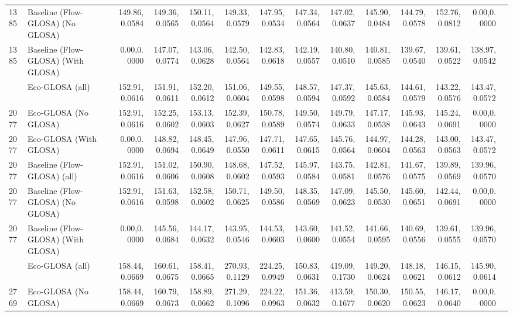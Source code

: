 \begin{table}[ht]
{\begin{tabular}{llrrrrrrrrrrrr}
      1385 & Baseline (Flow-GLOSA) (No GLOSA) & 149.86,0.0584 & 149.36,0.0565 & 150.11,0.0564 & 149.33,0.0579 & 147.95,0.0534 & 147.34,0.0564 & 147.02,0.0637 & 145.90,0.0484 & 144.79,0.0578 & 152.76,0.0812 &   0.00,0.0000 \\
      1385 & Baseline (Flow-GLOSA) (With GLOSA) &   0.00,0.0000 & 147.07,0.0774 & 143.06,0.0628 & 142.50,0.0564 & 142.83,0.0618 & 142.19,0.0557 & 140.80,0.0510 & 140.81,0.0585 & 139.67,0.0540 & 139.61,0.0522 & 138.97,0.0542 \\
      \addlinespace
      2077 & Eco-GLOSA (all)            & 152.91,0.0616 & 151.91,0.0611 & 152.20,0.0612 & 151.06,0.0604 & 149.55,0.0598 & 148.57,0.0594 & 147.37,0.0592 & 145.63,0.0584 & 144.61,0.0579 & 143.22,0.0576 & 143.47,0.0572 \\
      2077 & Eco-GLOSA (No GLOSA)       & 152.91,0.0616 & 152.25,0.0602 & 153.13,0.0603 & 152.39,0.0627 & 150.78,0.0589 & 149.50,0.0574 & 149.79,0.0633 & 147.17,0.0538 & 145.93,0.0643 & 145.24,0.0691 &   0.00,0.0000 \\
      2077 & Eco-GLOSA (With GLOSA)     &   0.00,0.0000 & 148.82,0.0694 & 148.45,0.0649 & 147.96,0.0550 & 147.71,0.0611 & 147.65,0.0615 & 145.76,0.0564 & 144.97,0.0604 & 144.28,0.0563 & 143.00,0.0563 & 143.47,0.0572 \\
      2077 & Baseline (Flow-GLOSA) (all)   & 152.91,0.0616 & 151.02,0.0606 & 150.90,0.0608 & 148.68,0.0602 & 147.52,0.0593 & 145.97,0.0584 & 143.75,0.0581 & 142.81,0.0576 & 141.67,0.0575 & 139.89,0.0569 & 139.96,0.0570 \\
      2077 & Baseline (Flow-GLOSA) (No GLOSA) & 152.91,0.0616 & 151.63,0.0598 & 152.58,0.0602 & 150.71,0.0625 & 149.50,0.0586 & 148.35,0.0569 & 147.09,0.0623 & 145.50,0.0530 & 145.60,0.0651 & 142.44,0.0691 &   0.00,0.0000 \\
      2077 & Baseline (Flow-GLOSA) (With GLOSA) &   0.00,0.0000 & 145.56,0.0684 & 144.17,0.0632 & 143.95,0.0546 & 144.53,0.0603 & 143.60,0.0600 & 141.52,0.0554 & 141.66,0.0595 & 140.69,0.0556 & 139.61,0.0555 & 139.96,0.0570 \\
      \addlinespace
      2769 & Eco-GLOSA (all)            & 158.44,0.0669 & 160.61,0.0675 & 158.41,0.0665 & 270.93,0.1129 & 224.25,0.0949 & 150.83,0.0631 & 419.09,0.1730 & 149.20,0.0624 & 148.18,0.0621 & 146.15,0.0612 & 145.90,0.0614 \\
      2769 & Eco-GLOSA (No GLOSA)       & 158.44,0.0669 & 160.79,0.0673 & 158.89,0.0662 & 271.29,0.1096 & 224.22,0.0963 & 151.36,0.0632 & 413.59,0.1677 & 150.30,0.0620 & 150.55,0.0623 & 146.17,0.0640 &   0.00,0.0000 \\

\end{tabular}}
\end{table}
